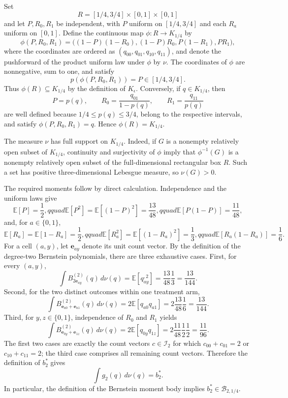 Set
\[
R=[1/4,3/4]\times[0,1]\times[0,1]
\]
and let \(P,R_0,R_1\) be independent, with \(P\) uniform on \([1/4,3/4]\) and each \(R_a\) uniform on \([0,1]\).  Define the continuous map \(\phi:R\to K_{1/4}\) by
\[
\phi(P,R_0,R_1)
=\bigl((1-P)(1-R_0),(1-P)R_0,P(1-R_1),PR_1\bigr),
\]
where the coordinates are ordered as \((q_{00},q_{01},q_{10},q_{11})\), and denote the pushforward of the product uniform law under \(\phi\) by \(\nu\).  The coordinates of \(\phi\) are nonnegative, sum to one, and satisfy
\[
p(\phi(P,R_0,R_1))=P\in[1/4,3/4].
\]
Thus \(\phi(R)\subseteq K_{1/4}\) by the definition of \(K_{\epsilon}\).  Conversely, if \(q\in K_{1/4}\), then
\[
P=p(q),\qquad R_0=\frac{q_{01}}{1-p(q)},\qquad R_1=\frac{q_{11}}{p(q)}
\]
are well defined because \(1/4\le p(q)\le3/4\), belong to the respective intervals, and satisfy \(\phi(P,R_0,R_1)=q\).  Hence \(\phi(R)=K_{1/4}\).

The measure \(\nu\) has full support on \(K_{1/4}\).  Indeed, if \(G\) is a nonempty relatively open subset of \(K_{1/4}\), continuity and surjectivity of \(\phi\) imply that \(\phi^{-1}(G)\) is a nonempty relatively open subset of the full-dimensional rectangular box \(R\).  Such a set has positive three-dimensional Lebesgue measure, so \(\nu(G)>0\).

The required moments follow by direct calculation.  Independence and the uniform laws give
\[
\mathbb E[P]=\frac12,qquad
\mathbb E[P^2]=\mathbb E[(1-P)^2]=\frac{13}{48},qquad
\mathbb E[P(1-P)]=\frac{11}{48},
\]
and, for \(a\in\{0,1\}\),
\[
\mathbb E[R_a]=\mathbb E[1-R_a]=\frac12,qquad
\mathbb E[R_a^2]=\mathbb E[(1-R_a)^2]=\frac13,qquad
\mathbb E[R_a(1-R_a)]=\frac16.
\]
For a cell \((a,y)\), let \(\mathbf e_{ay}\) denote its unit count vector.  By the definition of the degree-two Bernstein polynomials, there are three exhaustive cases.  First, for every \((a,y)\),
\[
\int B_{2\mathbf e_{ay}}^{(2)}(q)\,d\nu(q)
=\mathbb E[q_{ay}^{,2}]
=\frac{13}{48}\frac13
=\frac{13}{144}.
\]
Second, for the two distinct outcomes within one treatment arm,
\[
\int B_{\mathbf e_{a0}+\mathbf e_{a1}}^{(2)}(q)\,d\nu(q)
=2\mathbb E[q_{a0}q_{a1}]
=2\frac{13}{48}\frac16
=\frac{13}{144}.
\]
Third, for \(y,z\in\{0,1\}\), independence of \(R_0\) and \(R_1\) yields
\[
\int B_{\mathbf e_{0y}+\mathbf e_{1z}}^{(2)}(q)\,d\nu(q)
=2\mathbb E[q_{0y}q_{1z}]
=2\frac{11}{48}\frac12\frac12
=\frac{11}{96}.
\]
The first two cases are exactly the count vectors \(c\in\mathcal I_2\) for which \(c_{00}+c_{01}=2\) or \(c_{10}+c_{11}=2\); the third case comprises all remaining count vectors.  Therefore the definition of \(b_2^*\) gives
\[
\int g_2(q)\,d\nu(q)=b_2^*.
\]
In particular, the definition of the Bernstein moment body implies \(b_2^*\in\mathcal B_{2,1/4}\).

